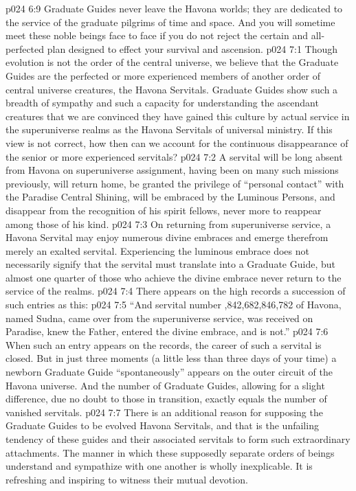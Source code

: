 \pc \vs p024 6:9 Graduate Guides never leave the Havona worlds; they are dedicated to the service of the graduate pilgrims of time and space. And you will sometime meet these noble beings face to face if you do not reject the certain and all\hyp{}perfected plan designed to effect your survival and ascension.
\vs p024 7:1 Though evolution is not the order of the central universe, we believe that the Graduate Guides are the perfected or more experienced members of another order of central universe creatures, the Havona Servitals. Graduate Guides show such a breadth of sympathy and such a capacity for understanding the ascendant creatures that we are convinced they have gained this culture by actual service in the superuniverse realms as the Havona Servitals of universal ministry. If this view is not correct, how then can we account for the continuous disappearance of the senior or more experienced servitals?\plusone
\vs p024 7:2 A servital will be long absent from Havona on superuniverse assignment, having been on many such missions previously, will return home, be granted the privilege of “personal contact” with the Paradise Central Shining, will be embraced by the Luminous Persons, and disappear from the recognition of his spirit fellows, never more to reappear among those of his kind.
\vs p024 7:3 On returning from superuniverse service, a Havona Servital may enjoy numerous divine embraces and emerge therefrom merely an exalted servital. Experiencing the luminous embrace does not necessarily signify that the servital must translate into a Graduate Guide, but almost one quarter of those who achieve the divine embrace never return to the service of the realms.
\pc \vs p024 7:4 There appears on the high records a succession of such entries as this:
\vs p024 7:5 \kern-1pt\relax “And \kern-0.3pt\relax servital \kern-0.3pt\relax number \kern-0.2pt,842,682,846,782 of Havona, named Sudna, came over from the superuniverse service, was received on Paradise, knew the Father, entered the divine embrace, and is not.”
\vs p024 7:6 When such an entry appears on the records, the career of such a servital is closed. But in just three moments (a little less than three days of your time) a newborn Graduate Guide “spontaneously” appears on the outer circuit of the Havona universe. And the number of Graduate Guides, allowing for a slight difference, due no doubt to those in transition, exactly equals the number of vanished servitals.\plusone
\pc \vs p024 7:7 There is an additional reason for supposing the Graduate Guides to be evolved Havona Servitals, and that is the unfailing tendency of these guides and their associated servitals to form such extraordinary attachments. The manner in which these supposedly separate orders of beings understand and sympathize with one another is wholly inexplicable. It is refreshing and inspiring to witness their mutual devotion.\plusone

